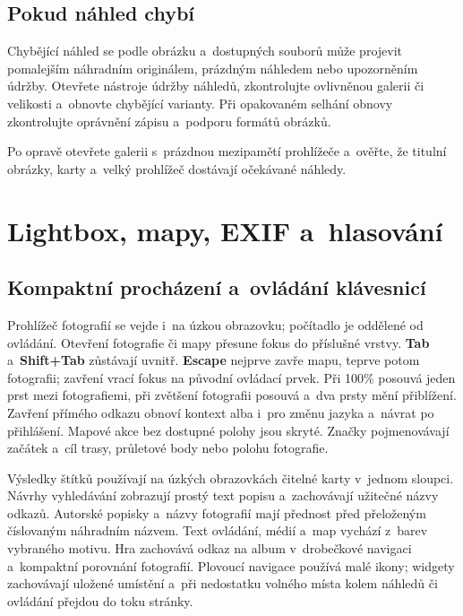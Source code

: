 \documentclass[11pt,a4paper]{article}
\newcommand{\ui}[1]{\textbf{#1}}
\begin{document}
\subsection{Pokud náhled chybí}

Chybějící náhled se podle obrázku a~dostupných souborů může projevit pomalejším
náhradním originálem, prázdným náhledem nebo upozorněním údržby. Otevřete
nástroje údržby náhledů, zkontrolujte ovlivněnou galerii či velikosti a~obnovte
chybějící varianty. Při opakovaném selhání obnovy zkontrolujte oprávnění zápisu
a~podporu formátů obrázků.

Po opravě otevřete galerii s~prázdnou mezipamětí prohlížeče a~ověřte, že titulní
obrázky, karty a~velký prohlížeč dostávají očekávané náhledy.
\section{Lightbox, mapy, EXIF a~hlasování}
\label{sec:lightbox}

\subsection{Kompaktní procházení a~ovládání klávesnicí}

Prohlížeč fotografií se vejde i~na úzkou obrazovku; počítadlo je oddělené
od ovládání. Otevření fotografie či mapy přesune fokus do příslušné vrstvy.
\ui{Tab} a~\ui{Shift+Tab} zůstávají uvnitř. \ui{Escape} nejprve zavře mapu,
teprve potom fotografii; zavření vrací fokus na původní ovládací prvek.
Při 100\% posouvá jeden prst mezi fotografiemi, při zvětšení fotografii
posouvá a~dva prsty mění přiblížení. Zavření přímého odkazu obnoví kontext
alba i~pro změnu jazyka a~návrat po přihlášení. Mapové akce bez dostupné
polohy jsou skryté. Značky pojmenovávají začátek a~cíl trasy, průletové
body nebo polohu fotografie.

Výsledky štítků používají na úzkých obrazovkách čitelné karty v~jednom
sloupci. Návrhy vyhledávání zobrazují prostý text popisu a~zachovávají
užitečné názvy odkazů. Autorské popisky a~názvy fotografií mají přednost
před přeloženým číslovaným náhradním názvem. Text ovládání, médií a~map
vychází z~barev vybraného motivu. Hra zachovává odkaz na album v~drobečkové
navigaci a~kompaktní porovnání fotografií. Plovoucí navigace používá malé
ikony; widgety zachovávají uložené umístění a~při nedostatku volného místa
kolem náhledů či ovládání přejdou do toku stránky.
\end{document}
